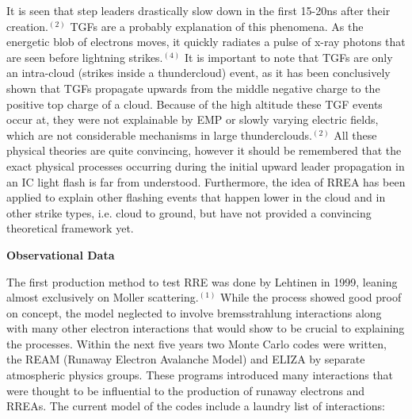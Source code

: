 \documentclass[11pt]{article}
\begin{document}
\begin{multicols*}{2}
    It is seen that step leaders drastically slow down in the first 15-20ns after their creation.$^{(2)}$ TGFs are a probably explanation of this phenomena. As the energetic blob of electrons moves, it quickly radiates a pulse of x-ray photons that are seen before lightning strikes.$^{(4)}$ It is important to note that TGFs are only an intra-cloud (strikes inside a thundercloud) event, as it has been conclusively shown that TGFs propagate upwards from the middle negative charge to the positive top charge of a cloud. Because of the high altitude these TGF events occur at, they were not explainable by EMP or slowly varying electric fields, which are not considerable mechanisms in large thunderclouds.$^{(2)}$ All these physical theories are quite convincing, however it should be remembered that the exact physical processes occurring during the initial upward leader propagation in an IC light flash is far from understood. Furthermore, the idea of RREA has been applied to explain other flashing events that happen lower in the cloud and in other strike types, i.e. cloud to ground, but have not provided a convincing theoretical framework yet.
    \newline


    \noindent
{\bf \LARGE Observational Data}

    \quad The first production method to test RRE was done by Lehtinen in 1999, leaning almost exclusively on Moller scattering.$^{(1)}$ While the process showed good proof on concept, the model neglected to involve bremsstrahlung interactions along with many other electron interactions that would show to be crucial to explaining the processes. Within the next five years two Monte Carlo codes were written, the REAM (Runaway Electron Avalanche Model) and ELIZA by separate atmospheric physics groups. These programs introduced many interactions that were thought to be influential to the production of runaway electrons and RREAs. The current model of the codes include a laundry list of interactions:
    

\end{multicols*}
\end{document}
